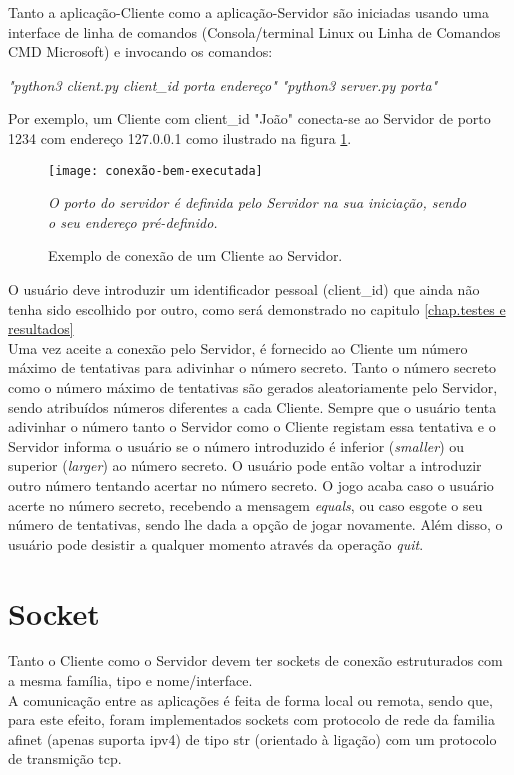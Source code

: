 Tanto a aplicação-Cliente como a aplicação-Servidor são iniciadas usando uma interface de linha de comandos (Consola/terminal Linux ou Linha de Comandos CMD Microsoft) e invocando os comandos:
\begin{center}
\Large\textsl{"python3 client.py client\_id porta endereço"} 
\Large\textsl{"python3 server.py porta"} 
\end{center}
Por exemplo, um Cliente com client\_id "João" conecta-se ao Servidor de porto 1234 com endereço 127.0.0.1 como ilustrado na figura \ref{fig:conexão-bem-executada1}. \\ 

	\begin{figure}[H]
		\centering
		\texttt{[image: conexão-bem-executada]}
		\caption{Exemplo de conexão de um Cliente ao Servidor.\\}
		\label{fig:conexão-bem-executada1}
		\flushleft\small\textit{O porto do servidor é definida pelo Servidor na sua iniciação, sendo o seu endereço pré-definido.}
	\end{figure} 

\newpage
O usuário deve introduzir um identificador pessoal (client\_id) que ainda não tenha sido escolhido por outro, como será demonstrado no capitulo \ref{chap.testes e resultados} \\
Uma vez aceite a conexão pelo Servidor, é fornecido ao Cliente um número máximo de tentativas para adivinhar o número secreto. Tanto o número secreto como o número máximo de tentativas são gerados aleatoriamente pelo Servidor, sendo atribuídos números diferentes a cada Cliente.
Sempre que o usuário tenta adivinhar o número tanto o Servidor como o Cliente registam essa tentativa e o Servidor informa o usuário se o número introduzido é inferior (\textit{smaller}) ou superior (\textit{larger}) ao número secreto. O usuário pode então voltar a introduzir outro número tentando acertar no número secreto. O jogo acaba caso o usuário acerte no número secreto, recebendo a mensagem \textit{equals}, ou caso esgote o seu número de tentativas, sendo lhe dada a opção de jogar novamente. Além disso, o usuário pode desistir a qualquer momento através da operação \textit{quit}.\\
\section{Socket}
\label{sec.socket}
Tanto o Cliente como o Servidor devem ter sockets de conexão estruturados com a mesma família, tipo e nome/interface. \\
A comunicação entre as aplicações é feita de forma local ou remota, sendo que, para este efeito, foram implementados sockets com protocolo de rede da familia \ac{afinet} (apenas suporta \ac{ipv4}) de tipo \ac{str} (orientado à ligação) com um protocolo de transmição \ac{tcp}.

